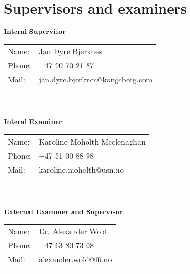 \section{Supervisors and examiners}

\textbf{Interal Supervisor}\\
\begin{tabular}{ll}                                              
Name: 	            & Jan Dyre Bjerknes	         \\
Phone:		        & +47 90 70 21 87			     \\
Mail:	            & jan.dyre.bjerknes@kongsberg.com  \\\\      
\end{tabular}
\\\\
\textbf{Interal Examiner}\\
\begin{tabular}{ll}                                              
Name: 	            & Karoline Moholth Mcclenaghan   \\
Phone:		        & +47 31 00 88 98			     \\
Mail:	            & karoline.moholth@usn.no 	    \\\\      
\end{tabular}
\\\\
\textbf{External Examiner and Supervisor}\\
\begin{tabular}{ll}                                              
Name: 	            & Dr. Alexander Wold   \\
Phone:		        & +47 63 80 73 08			     \\
Mail:	            & alexander.wold@ffi.no 	    \\\\      
\end{tabular}
\\\

